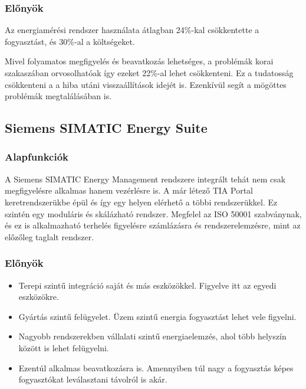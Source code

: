 \subsubsection{Előnyök}

Az energiamérési rendszer használata átlagban 24\%-kal csökkentette a fogyasztást, 
és 30\%-al a költségeket.

Mivel folyamatos megfigyelés és  beavatkozás lehetséges, a problémák korai szakaszában orvosolhatóak így
ezeket 22\%-al lehet csökkenteni. Ez a tudatosság csökkenteni a a hiba utáni visszaállítások idejét is.
Ezenkívül segít a mögöttes problémák megtalálásában is.\cite{sePME}

\subsection{Siemens SIMATIC Energy Suite}

\subsubsection{Alapfunkciók}

A Siemens SIMATIC Energy Management rendszere integrált tehát nem csak megfigyelésre alkalmas hanem vezérlésre is. 
A már létező TIA Portal keretrendszerükbe épül és így egy helyen elérhető a többi rendszerükkel. 
Ez szintén egy moduláris és skálázható rendszer.
Megfelel az ISO 50001 szabványnak, és ez is alkalmazható terhelés figyelésre számlázásra és rendszerelemzésre,
mint az előzőleg taglalt rendszer.\cite{sieEMS}

\subsubsection{Előnyök}

\begin{itemize}
    \item Terepi szintű integráció saját és más eszközökkel. Figyelve itt az egyedi eszközökre.
    \item Gyártás szintű felügyelet. Üzem szintű energia fogyasztást lehet vele figyelni.
    \item Nagyobb rendszerekben vállalati szintű energiaelemzés, ahol több helyszín között is lehet felügyelni.
    \item Ezentúl alkalmas beavatkozásra is. Amennyiben túl nagy a fogyasztás képes fogyasztókat leválasztani távolról is akár.
\end{itemize}
\cite{sieEMS}


